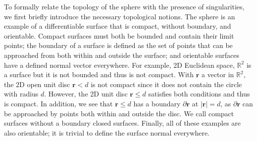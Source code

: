 To formally relate the topology of the sphere with the presence of singularities, we first briefly introduce the necessary topological notions.
The sphere is an example of a differentiable surface that is compact, without boundary, and orientable.
Compact surfaces must both be bounded and contain their limit points; the boundary of a surface is defined as the set of points that can be approached from both within and outside the surface; and orientable surfaces have a defined normal vector everywhere.
For example, 2D Euclidean space, $\mathbb{R}^2$ is a surface but it is not bounded and thus is not compact.
With $\mathbf{r}$ a vector in $\mathbb{R}^2$, the 2D open unit disc $\mathbf{r} < d$ is not compact since it does not contain the circle with radius $d$.
However, the 2D unit disc $\mathbf{r} \leq d$ satisfies both conditions and thus is compact.
In addition, we see that $\mathbf{r} \leq d$ has a boundary $\partial \mathbf{r}$ at $|\mathbf{r}| = d$, as $\partial \mathbf{r}$ can be approached by points both within and outside the disc.
We call compact surfaces without a boundary closed surfaces.
Finally, all of these examples are also orientable; it is trivial to define the surface normal everywhere.

